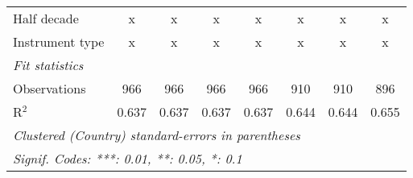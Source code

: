 \begin{tabular}{lccccccc}
   Half decade                                                                             & x            & x            & x            & x            & x            & x            & x\\  
   Instrument type                                                                         & x            & x            & x            & x            & x            & x            & x\\  
   \midrule \emph{Fit statistics}\\
   Observations                                                                            & 966          & 966          & 966          & 966          & 910          & 910          & 896\\  
   R$^2$                                                                                   & 0.637        & 0.637        & 0.637        & 0.637        & 0.644        & 0.644        & 0.655\\  
   \midrule
   \multicolumn{8}{l}{\emph{Clustered (Country) standard-errors in parentheses}}\\
   \multicolumn{8}{l}{\emph{Signif. Codes: ***: 0.01, **: 0.05, *: 0.1}}\\
\end{tabular}
\par\endgroup


